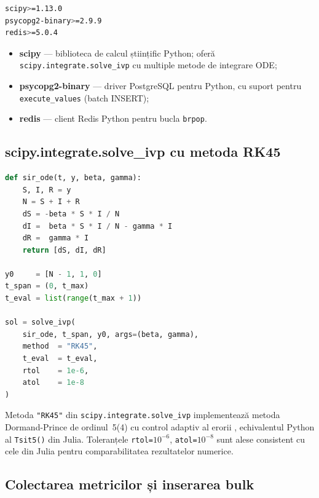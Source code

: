 \begin{lstlisting}[language=bash, caption={\texttt{requirements.txt} al runner-ului Python.}]
scipy>=1.13.0
psycopg2-binary>=2.9.9
redis>=5.0.4
\end{lstlisting}

\begin{itemize}
  \item \textbf{scipy} --- biblioteca de calcul științific Python; oferă
    \texttt{scipy.integrate.solve\_ivp} cu multiple metode de integrare ODE;
  \item \textbf{psycopg2-binary} --- driver PostgreSQL pentru Python, cu
    suport pentru \texttt{execute\_values} (batch INSERT);
  \item \textbf{redis} --- client Redis Python pentru bucla \texttt{brpop}.
\end{itemize}

\subsection{scipy.integrate.solve\_ivp cu metoda RK45}
\label{subsec:python_scipy}

\begin{lstlisting}[language=Python, caption={Definiția sistemului SIR în Python și apelul \texttt{solve\_ivp()}.}]
def sir_ode(t, y, beta, gamma):
    S, I, R = y
    N = S + I + R
    dS = -beta * S * I / N
    dI =  beta * S * I / N - gamma * I
    dR =  gamma * I
    return [dS, dI, dR]

y0     = [N - 1, 1, 0]
t_span = (0, t_max)
t_eval = list(range(t_max + 1))

sol = solve_ivp(
    sir_ode, t_span, y0, args=(beta, gamma),
    method  = "RK45",
    t_eval  = t_eval,
    rtol    = 1e-6,
    atol    = 1e-8
)
\end{lstlisting}

Metoda \texttt{"RK45"} din \texttt{scipy.integrate.solve\_ivp} implementează
metoda Dormand-Prince de ordinul~5(4) cu control adaptiv al erorii
\cite{dormand1980family}, echivalentul Python al \texttt{Tsit5()} din Julia.
Toleranțele \texttt{rtol=$10^{-6}$}, \texttt{atol=$10^{-8}$} sunt alese
consistent cu cele din Julia pentru comparabilitatea rezultatelor numerice.

\subsection{Colectarea metricilor și inserarea bulk}
\label{subsec:python_stocare}

